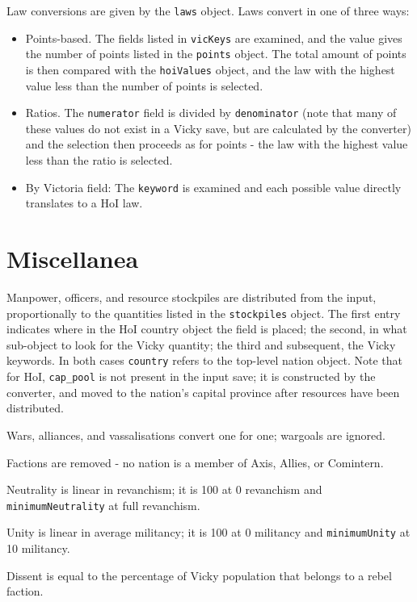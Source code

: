 \documentclass[12pt,ebook,oneside]{book}
\begin{document}
Law conversions are given by the \texttt{laws} object.
Laws convert in one of three ways:
\begin{itemize}
\item Points-based. The fields listed in \texttt{vicKeys} are
  examined, and the value gives the number of points listed in the
  \texttt{points} object. The total amount of points is then compared
  with the \texttt{hoiValues} object, and the law with the highest
  value less than the number of points is selected. 
\item Ratios. The \texttt{numerator} field is divided by
  \texttt{denominator} (note that many of these values do not exist in
  a Vicky save, but are calculated by the converter) and the selection
  then proceeds as for points - the law with the highest value less
  than the ratio is selected. 
\item By Victoria field: The \texttt{keyword} is examined and each
  possible value directly translates to a HoI law. 
\end{itemize}

\section{Miscellanea}

Manpower, officers, and resource stockpiles are distributed 
from the input, proportionally to the quantities listed in the
\texttt{stockpiles} object. The first entry indicates where in the HoI
country object the field is placed; the second, in what sub-object to
look for the Vicky quantity; the third and subsequent, the Vicky keywords. In both
cases \texttt{country} refers to the top-level nation
object. Note that for HoI, \texttt{cap\_pool} is not present in the
input save; it is constructed by the converter, and moved to the
nation's capital province after resources have been distributed. 

Wars, alliances, and vassalisations convert one for one; wargoals are
ignored. 

Factions are removed - no nation is a member of Axis, Allies, or
Comintern. 

Neutrality is linear in revanchism; it is 100 at 0 revanchism and
\texttt{minimumNeutrality} at full revanchism. 

Unity is linear in average militancy; it is 100 at 0 militancy and
\texttt{minimumUnity} at 10 militancy. 

Dissent is equal to the percentage of Vicky population that belongs to a
rebel faction. 
\end{document}

